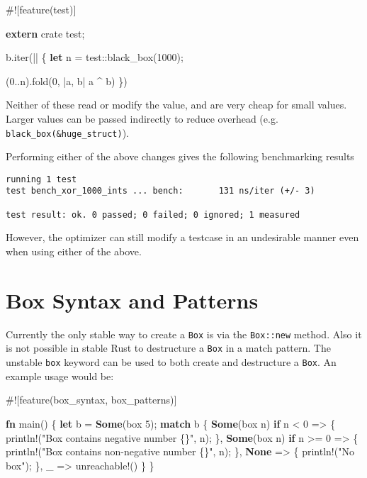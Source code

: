 \documentclass[a4paper,]{book}
\newenvironment{Shaded}{\begin{snugshade}}{\end{snugshade}}
\newcommand{\KeywordTok}[1]{\textcolor[rgb]{0.13,0.29,0.53}{\textbf{{#1}}}}
\newcommand{\DecValTok}[1]{\textcolor[rgb]{0.00,0.00,0.81}{{#1}}}
\newcommand{\StringTok}[1]{\textcolor[rgb]{0.31,0.60,0.02}{{#1}}}
\newcommand{\OtherTok}[1]{\textcolor[rgb]{0.56,0.35,0.01}{{#1}}}
\newcommand{\NormalTok}[1]{{#1}}
\begin{document}
\begin{Shaded}
\begin{Highlighting}[]
\NormalTok{#![feature(test)]}

\KeywordTok{extern} \NormalTok{crate test;}

\NormalTok{b.iter(|| \{}
    \KeywordTok{let} \NormalTok{n = test::black_box(}\DecValTok{1000}\NormalTok{);}

    \NormalTok{(}\DecValTok{0.}\NormalTok{.n).fold(}\DecValTok{0}\NormalTok{, |a, b| a ^ b)}
\NormalTok{\})}
\end{Highlighting}
\end{Shaded}

Neither of these read or modify the value, and are very cheap for small
values. Larger values can be passed indirectly to reduce overhead (e.g.
\texttt{black\_box(\&huge\_struct)}).

Performing either of the above changes gives the following benchmarking
results

\begin{verbatim}
running 1 test
test bench_xor_1000_ints ... bench:       131 ns/iter (+/- 3)

test result: ok. 0 passed; 0 failed; 0 ignored; 1 measured
\end{verbatim}

However, the optimizer can still modify a testcase in an undesirable
manner even when using either of the above.

\section{Box Syntax and Patterns}\label{sec--box-syntax-and-patterns}

Currently the only stable way to create a \texttt{Box} is via the
\texttt{Box::new} method. Also it is not possible in stable Rust to
destructure a \texttt{Box} in a match pattern. The unstable \texttt{box}
keyword can be used to both create and destructure a \texttt{Box}. An
example usage would be:

\begin{Shaded}
\begin{Highlighting}[]
\NormalTok{#![feature(box_syntax, box_patterns)]}

\KeywordTok{fn} \NormalTok{main() \{}
    \KeywordTok{let} \NormalTok{b = }\KeywordTok{Some}\NormalTok{(box }\DecValTok{5}\NormalTok{);}
    \KeywordTok{match} \NormalTok{b \{}
        \KeywordTok{Some}\NormalTok{(box n) }\KeywordTok{if} \NormalTok{n < }\DecValTok{0} \NormalTok{=> \{}
            \OtherTok{println!}\NormalTok{(}\StringTok{"Box contains negative number \{\}"}\NormalTok{, n);}
        \NormalTok{\},}
        \KeywordTok{Some}\NormalTok{(box n) }\KeywordTok{if} \NormalTok{n >= }\DecValTok{0} \NormalTok{=> \{}
            \OtherTok{println!}\NormalTok{(}\StringTok{"Box contains non-negative number \{\}"}\NormalTok{, n);}
        \NormalTok{\},}
        \KeywordTok{None} \NormalTok{=> \{}
            \OtherTok{println!}\NormalTok{(}\StringTok{"No box"}\NormalTok{);}
        \NormalTok{\},}
        \NormalTok{_ => }\OtherTok{unreachable!}\NormalTok{()}
    \NormalTok{\}}
\NormalTok{\}}
\end{Highlighting}
\end{Shaded}
\end{document}
